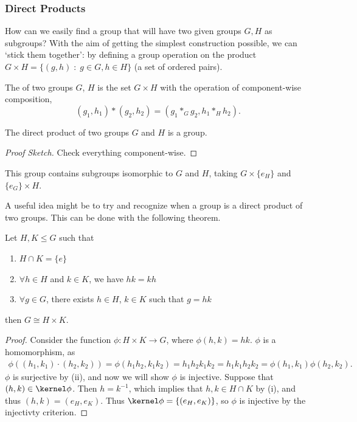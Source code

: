 \documentclass[a4paper]{scrartcl}
\begin{document}
\subsubsection{Direct Products}

How can we easily find a group that will have two given groups $G, H$ as subgroups?
With the aim of getting the simplest construction possible, we can `stick them together': by defining a group operation on the product $G \times H = \{ (g, h)  \; : \; g \in G, h \in H\}$ (a set of ordered pairs).

\begin{definition}
	The  of two groups $G$, $H$ is the set $G \times H$ with the operation of component-wise composition,
	$$
	(g_1, h_1) * (g_2, h_2) = (g_1 *_G g_2, h_1 *_H h_2).
	$$
\end{definition}

\begin{proposition}
	The direct product of two groups $G$ and $H$ is a group.
\end{proposition}
\begin{proof}[Proof Sketch]
	Check everything component-wise.
\end{proof}

This group contains subgroups isomorphic to $G$ and $H$, taking $G \times \{ e_H \}$ and $\{ e_G \} \times H$.

A useful idea might be to try and recognize when a group is a direct product of two groups. This can be done with the following theorem.

\begin{theorem}
	Let $H, K \leq G$ such that
	\begin{enumerate}[label=(\roman*)]
		\item $H \cap K = \{e\}$
		\item $\forall h \in H$ and $k \in K$, we have $hk = kh$
		\item $\forall g \in G$, there exists $h \in H$, $k \in K$ such that $g = hk$
	\end{enumerate}
	then $G \cong H \times K$.
\end{theorem}
% 
\begin{proof}
	Consider the function $\phi : H \times K \rightarrow G$, where $\phi(h, k) = hk$.
	$\phi$ is a homomorphism, as
	\begin{align*}
		\phi((h_1, k_1) \cdot (h_2, k_2)) = \phi(h_1 h_2, k_1 k_2) = h_1 h_2 k_1 k_2 = h_1 k_1 h_2 k_2 = \phi(h_1, k_1) \phi(h_2, k_2).
	\end{align*}
	$\phi$ is surjective by (ii), and now we will show $\phi$ is injective.
	Suppose that $(h, k) \in \kernel\phi$. Then $h = k^{-1}$, which implies that $h, k \in H \cap K$ by (i), and thus $(h, k) = (e_H, e_K)$. Thus $\kernel \phi = \{(e_H, e_K)\}$, so $\phi$ is injective by the injectivty criterion.
\end{proof}
\end{document}

